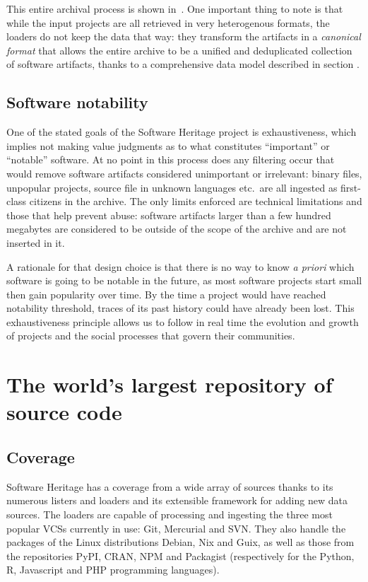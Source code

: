 This entire archival process is shown in~. One
important thing to note is that while the input projects are all retrieved in
very heterogenous formats, the loaders do not keep the data that way: they
transform the artifacts in a \emph{canonical format} that allows the entire
archive to be a unified and deduplicated collection of software artifacts,
thanks to a comprehensive data model described in section \TODO{}.

\subsection{Software notability}

One of the stated goals of the Software Heritage project is exhaustiveness,
which implies not making value judgments as to what constitutes ``important''
or ``notable'' software. At no point in this process does any filtering occur
that would remove software artifacts considered unimportant or irrelevant:
binary files, unpopular projects, source file in unknown languages etc.\ are
all ingested as first-class citizens in the archive. The only limits enforced
are technical limitations and those that help prevent abuse: software artifacts
larger than a few hundred megabytes are considered to be outside of the scope
of the archive and are not inserted in it.

A rationale for that design choice is that there is no way to know \emph{a
priori} which software is going to be notable in the future, as most software
projects start small then gain popularity over time. By the time a project
would have reached notability threshold, traces of its past history could have
already been lost. This exhaustiveness principle allows us to follow in real
time the evolution and growth of projects and the social processes that govern
their communities.

\section{The world's largest repository of source code}

\subsection{Coverage}

Software Heritage has a coverage from a wide array of sources thanks to its
numerous listers and loaders and its extensible framework for adding new data
sources. The loaders are capable of processing and ingesting the three most
popular \glspl{VCS} currently in use: Git, Mercurial and SVN\@. They also handle
the packages of the Linux distributions Debian, Nix and Guix, as well as those
from the repositories PyPI, CRAN, NPM and Packagist (respectively for the
Python, R, Javascript and PHP programming languages).

